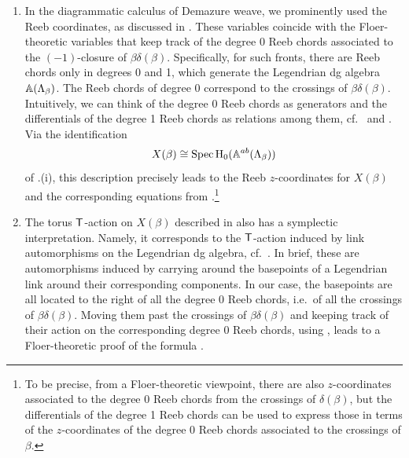 \begin{enumerate}
    \item In the diagrammatic calculus of Demazure weave, we prominently used the Reeb coordinates, as discussed in . These variables coincide with the Floer-theoretic variables that keep track of the degree 0 Reeb chords associated to the $(-1)$-closure of $\beta\delta(\beta)$. Specifically, for such fronts, there are Reeb chords only in degrees 0 and 1, which generate the Legendrian dg algebra $\mathbb{A}(\Lambda_{\beta})$. The Reeb chords of degree 0 correspond to the crossings of $\beta\delta(\beta)$. Intuitively, we can think of the degree 0 Reeb chords as generators and the differentials of the degree 1 Reeb chords as relations among them, cf.~\cite[Section 5]{CasalsNg22} and \cite[Corollary 1.1]{casals2026vanishinghigherlegendrianhomology}. Via the identification
    $$X(\beta)\cong \operatorname{Spec} \mbox{H}_0(\mathbb{A}^{ab}(\Lambda_{\beta}))$$
    of .(i), this description precisely leads to the Reeb $z$-coordinates for $X(\beta)$ and the corresponding equations from .\footnote{To be precise, from a Floer-theoretic viewpoint, there are also $z$-coordinates associated to the degree 0 Reeb chords from the crossings of $\delta(\beta)$, but the differentials of the degree 1 Reeb chords can be used to express those in terms of the $z$-coordinates of the degree 0 Reeb chords associated to the crossings of $\beta$.}\\

    \item The torus $\mathsf{T}$-action on $X(\beta)$ described in  also has a symplectic interpretation. Namely, it corresponds to the $\mathsf{T}$-action induced by link automorphisms on the Legendrian dg algebra, cf.~\cite[Section 3.2]{CasalsNg22}. In brief, these are automorphisms induced by carrying around the basepoints of a Legendrian link around their corresponding components. In our case, the basepoints are all located to the right of all the degree 0 Reeb chords, i.e.~of all the crossings of $\beta\delta(\beta)$. Moving them past the crossings of $\beta\delta(\beta)$ and keeping track of their action on the corresponding degree 0 Reeb chords, using \cite[Section 4.1.1]{CasalsNg22}, leads to a Floer-theoretic proof of the formula .
\end{enumerate}
